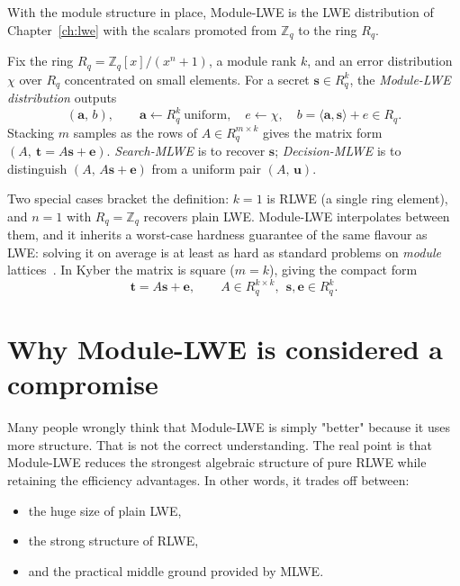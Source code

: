 With the module structure in place, Module-LWE is the LWE distribution of Chapter~\ref{ch:lwe} with the scalars promoted from $\mathbb{Z}_q$ to the ring $R_q$.

\begin{definition}
Fix the ring $R_q=\mathbb{Z}_q[x]/(x^n+1)$, a module rank $k$, and an error distribution $\chi$ over $R_q$ concentrated on small elements. For a secret $\mathbf{s}\in R_q^{k}$, the \emph{Module-LWE distribution} outputs
\[
(\mathbf{a},\,b),\qquad \mathbf{a}\leftarrow R_q^{k}\ \text{uniform},\quad e\leftarrow\chi,\quad b=\langle \mathbf{a},\mathbf{s}\rangle + e\in R_q.
\]
Stacking $m$ samples as the rows of $A\in R_q^{m\times k}$ gives the matrix form $(A,\ \mathbf{t}=A\mathbf{s}+\mathbf{e})$. \emph{Search-MLWE} is to recover $\mathbf{s}$; \emph{Decision-MLWE} is to distinguish $(A,\,A\mathbf{s}+\mathbf{e})$ from a uniform pair $(A,\,\mathbf{u})$.
\end{definition}

Two special cases bracket the definition: $k=1$ is RLWE (a single ring element), and $n=1$ with $R_q=\mathbb{Z}_q$ recovers plain LWE. Module-LWE interpolates between them, and it inherits a worst-case hardness guarantee of the same flavour as LWE: solving it on average is at least as hard as standard problems on \emph{module} lattices~\cite{langlois2015}. In Kyber the matrix is square ($m=k$), giving the compact form
\[
\mathbf{t} = A\mathbf{s} + \mathbf{e}, \qquad A\in R_q^{k\times k},\ \ \mathbf{s},\mathbf{e}\in R_q^{k}.
\]

\section{Why Module-LWE is considered a compromise}

Many people wrongly think that Module-LWE is simply "better" because it uses more structure. That is not the correct understanding. The real point is that Module-LWE reduces the strongest algebraic structure of pure RLWE while retaining the efficiency advantages. In other words, it trades off between:

\begin{itemize}
    \item the huge size of plain LWE,
    \item the strong structure of RLWE,
    \item and the practical middle ground provided by MLWE.
\end{itemize}

